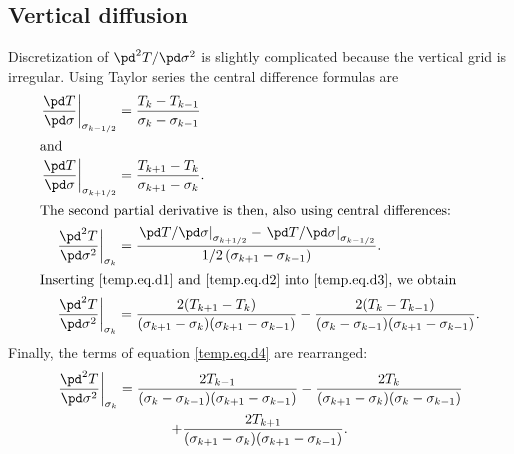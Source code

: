 \subsection{Vertical diffusion}
\label{sc:glide_vert_diff}
Discretization of $\pd^2T/\pd\sigma^2$ is slightly complicated because the vertical grid is irregular. Using Taylor series the central difference formulas are
\begin{subequations}
  \begin{align}
    \label{temp.eq.d1}
    \left.\frac{\pd T}{\pd\sigma}\right|_{\sigma_{k-1/2}}&=\frac{T_k-T_{k-1}}{\sigma_k-\sigma_{k-1}}\\
    \intertext{and}
    \label{temp.eq.d2}
    \left.\frac{\pd T}{\pd\sigma}\right|_{\sigma_{k+1/2}}&=\frac{T_{k+1}-T_k}{\sigma_{k+1}-\sigma_k}.\\
    \intertext{The second partial derivative is then, also using central differences:}
    \label{temp.eq.d3}
    \left.\frac{\pd^2 T}{\pd\sigma^2}\right|_{\sigma_k} &= \frac{\left.{\pd T}/{\pd\sigma}\right|_{\sigma_{k+1/2}} - \left.{\pd T}/{\pd\sigma}\right|_{\sigma_{k-1/2}}}{1/2\left(\sigma_{k+1}-\sigma_{k-1}\right)}.\\
    \intertext{Inserting \eqref{temp.eq.d1} and \eqref{temp.eq.d2} into \eqref{temp.eq.d3}, we obtain}
    \label{temp.eq.d4}
    \left.\frac{\pd^2 T}{\pd\sigma^2}\right|_{\sigma_k}&=\frac{2(T_{k+1}-T_k)}{(\sigma_{k+1}-\sigma_k)(\sigma_{k+1}-\sigma_{k-1})}-\frac{2(T_k-T_{k-1})}{(\sigma_k-\sigma_{k-1})(\sigma_{k+1}-\sigma_{k-1})}.
  \end{align}
\end{subequations}
Finally, the terms of equation \eqref{temp.eq.d4} are rearranged:
\begin{multline}
  \label{temp.eq.dsigma2}
  \left.\frac{\pd^2 T}{\pd\sigma^2}\right|_{\sigma_k} = \frac{2T_{k-1}}{(\sigma_k-\sigma_{k-1})(\sigma_{k+1}-\sigma_{k-1})} - \frac{2T_k}{(\sigma_{k+1}-\sigma_k)(\sigma_k-\sigma_{k-1})}\\
  + \frac{2T_{k+1}}{(\sigma_{k+1}-\sigma_k)(\sigma_{k+1}-\sigma_{k-1})}.
\end{multline}

